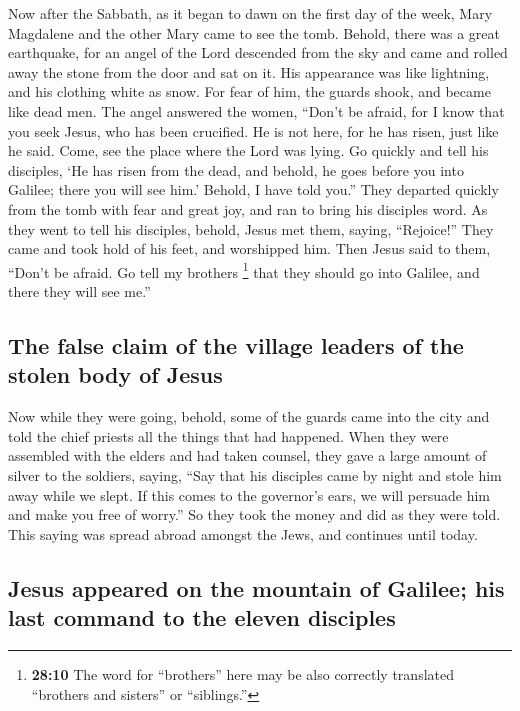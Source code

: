  Now after the Sabbath, as it began to dawn on the first
day of the week, Mary Magdalene and the other Mary came to see the tomb.
 Behold, there was a great earthquake, for an angel of the
Lord descended from the sky and came and rolled away the stone from the
door and sat on it.  His appearance was like lightning,
and his clothing white as snow.  For fear of him, the
guards shook, and became like dead men.  The angel
answered the women, ``Don't be afraid, for I know that you seek Jesus,
who has been crucified.  He is not here, for he has risen,
just like he said. Come, see the place where the Lord was lying.
 Go quickly and tell his disciples, `He has risen from the
dead, and behold, he goes before you into Galilee; there you will see
him.' Behold, I have told you.''  They departed quickly
from the tomb with fear and great joy, and ran to bring his disciples
word.  As they went to tell his disciples, behold, Jesus
met them, saying, ``Rejoice!'' They came and took hold of his feet, and
worshipped him.  Then Jesus said to them, ``Don't be
afraid. Go tell my brothers \footnote{\textbf{28:10} The word for
  ``brothers'' here may be also correctly translated ``brothers and
  sisters'' or ``siblings.''} that they should go into Galilee, and
there they will see me.''

\hypertarget{the-false-claim-of-the-village-leaders-of-the-stolen-body-of-jesus}{%
\subsection{The false claim of the village leaders of the stolen body of
Jesus}\label{the-false-claim-of-the-village-leaders-of-the-stolen-body-of-jesus}}

 Now while they were going, behold, some of the guards
came into the city and told the chief priests all the things that had
happened.  When they were assembled with the elders and
had taken counsel, they gave a large amount of silver to the soldiers,
 saying, ``Say that his disciples came by night and stole
him away while we slept.  If this comes to the governor's
ears, we will persuade him and make you free of worry.'' 
So they took the money and did as they were told. This saying was spread
abroad amongst the Jews, and continues until today.

\hypertarget{jesus-appeared-on-the-mountain-of-galilee-his-last-command-to-the-eleven-disciples}{%
\subsection{Jesus appeared on the mountain of Galilee; his last command
to the eleven
disciples}\label{jesus-appeared-on-the-mountain-of-galilee-his-last-command-to-the-eleven-disciples}}

